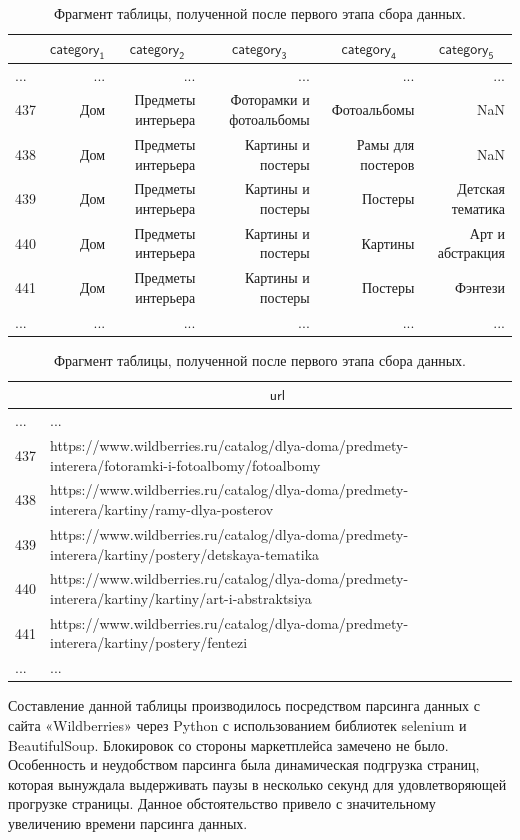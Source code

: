 \documentclass[a4paper,12pt]{extarticle}
\begin{document}
\begin{table}[ht]
\caption{Фрагмент таблицы, полученной после первого этапа сбора данных.}
\label{table:datastatistic0}
\footnotesize
\centering
	\begin{tabular}{lrrrrr}
		\toprule
		{} & \multicolumn{1}{c}{$\mathsf{category_1}$} &\multicolumn{1}{c}{$\mathsf{category_2}$} &  \multicolumn{1}{c}{$\mathsf{category_3}$} & \multicolumn{1}{c}{$\mathsf{category_4}$} &  \multicolumn{1}{c}{$\mathsf{category_5}$}\\
		\midrule
		... & ... & ... & ... & ... & ... \\
		437 & Дом & Предметы интерьера & Фоторамки и фотоальбомы & Фотоальбомы       & NaN\\
		438 & Дом & Предметы интерьера & Картины и постеры       & Рамы для постеров & NaN\\
		439 & Дом & Предметы интерьера & Картины и постеры       & Постеры           & Детская тематика\\
		440 & Дом & Предметы интерьера & Картины и постеры       & Картины           & Арт и абстракция\\
		441 & Дом & Предметы интерьера & Картины и постеры       & Постеры           & Фэнтези\\
		... & ... & ... & ... & ... & ... \\
		\bottomrule
	\end{tabular}
	\begin{tabular}{ll}
		\toprule
		{} & \multicolumn{1}{c}{$\mathsf{url}$}\\
		\midrule
		... & ... \\
		437 & https://www.wildberries.ru/catalog/dlya-doma/predmety-interera/fotoramki-i-fotoalbomy/fotoalbomy\\
		438 & https://www.wildberries.ru/catalog/dlya-doma/predmety-interera/kartiny/ramy-dlya-posterov\\
		439 & https://www.wildberries.ru/catalog/dlya-doma/predmety-interera/kartiny/postery/detskaya-tematika\\
		440 & https://www.wildberries.ru/catalog/dlya-doma/predmety-interera/kartiny/kartiny/art-i-abstraktsiya\\
		441 & https://www.wildberries.ru/catalog/dlya-doma/predmety-interera/kartiny/postery/fentezi\\
		... & ... \\
		\bottomrule
	\end{tabular}
\end{table}

Составление данной таблицы производилось посредством парсинга данных с сайта «Wildberries» через Python с использованием библиотек selenium и BeautifulSoup. Блокировок со стороны маркетплейса замечено не было. Особенность и неудобством парсинга была динамическая подгрузка страниц, которая вынуждала выдерживать паузы в несколько секунд для удовлетворяющей прогрузке страницы. Данное обстоятельство привело с значительному увеличению времени парсинга данных.
\end{document}
